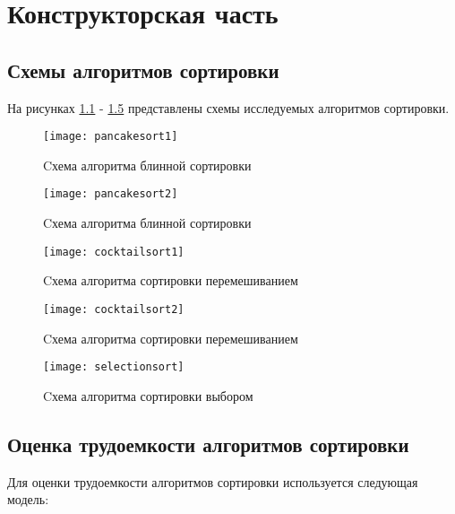 \chapter{Конструкторская часть}

\section{Схемы алгоритмов сортировки}

На рисунках \ref{pss1} - \ref{sss} представлены схемы исследуемых алгоритмов сортировки.

\begin{figure}[h]
	\centering
	\texttt{[image: pancakesort1]}
	\caption{Cхема алгоритма блинной сортировки}
	\label{pss1}
\end{figure}

\begin{figure}[h]
	\centering
	\texttt{[image: pancakesort2]}
	\caption{Cхема алгоритма блинной сортировки}
	\label{pss2}
\end{figure}

\begin{figure}[h]
	\centering
	\texttt{[image: cocktailsort1]}
	\caption{Cхема алгоритма сортировки перемешиванием}
	\label{css1}
\end{figure}

\begin{figure}[h]
	\centering
	\texttt{[image: cocktailsort2]}
	\caption{Cхема алгоритма сортировки перемешиванием}
	\label{css2}
\end{figure}

\begin{figure}[h]
	\centering
	\texttt{[image: selectionsort]}
	\caption{Cхема алгоритма сортировки выбором}
	\label{sss}
\end{figure}

\section{Оценка трудоемкости алгоритмов сортировки}

Для оценки трудоемкости алгоритмов сортировки используется следующая модель:

